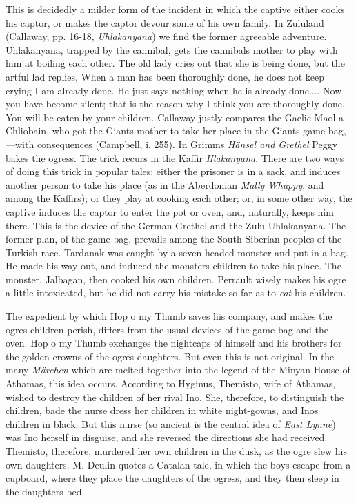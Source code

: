 \documentclass[14pt,a4paper]{memoir}
\begin{document}
{{This is decidedly a milder form of the incident in which the captive
either cooks his captor, or makes the captor devour some of his own
family. In Zululand (Callaway, pp. 16-18, \emph{Uhlakanyana}) we find
the former agreeable adventure. Uhlakanyana, trapped by the cannibal,
gets the cannibal\textquotesingle s mother to play with him at boiling
each other. The old lady cries out that she is \textquotesingle being
done,\textquotesingle{} but the artful lad replies,
\textquotesingle When a man has been thoroughly done, he does not keep
crying I am already done. He just says nothing when he is already
done.... Now you have become silent; that is the reason why I think you
are thoroughly done. You will be eaten by your
children.\textquotesingle{} Callaway justly compares the Gaelic Maol a
Chliobain, who got the Giant\textquotesingle s mother to take her place
in the Giant\textquotesingle s game-bag,---with consequences (Campbell,
i. 255). In Grimm\textquotesingle s \emph{Hänsel and Grethel} Peggy
bakes the ogress. The trick recurs in the Kaffir
\emph{Hlakanyana}.
There are two ways of doing this trick in popular tales: either the
prisoner is in a sack, and induces another person to take his place (as
in the Aberdonian \emph{Mally Whuppy}, and among the Kaffirs); or they
play at cooking each other; or, in some other way, the captive induces
the captor to enter the pot or oven, and, naturally, keeps him there.
This is the device of the German Grethel and the Zulu Uhlakanyana. The
former plan, of the game-bag, prevails among the South Siberian peoples
of the Turkish race. Tardanak was caught by a seven-headed monster and
put in a bag. He made his way out, and induced the
monster\textquotesingle s children to take his place. The monster,
Jalbagan, then cooked his own children. Perrault wisely makes his ogre a
little intoxicated, but he did not carry his mistake so far as to
\emph{eat} his children.

The expedient by which Hop o\textquotesingle{} my Thumb saves his
company, and makes the ogre\textquotesingle s children perish, differs
from the usual devices of the game-bag and the oven. Hop
o\textquotesingle{} my Thumb exchanges the nightcaps of himself and his
brothers for the golden crowns of the ogre\textquotesingle s daughters.
But even this is not original. In the many \emph{Märchen} which are
melted together into the legend of the Minyan House of Athamas, this
idea occurs. According to Hyginus, Themisto, wife of Athamas, wished to
destroy the children of her rival Ino. She, therefore, to distinguish
the children, bade the nurse dress her children in white night-gowns,
and Ino\textquotesingle s children in black. But this nurse (so ancient
is the central idea of \emph{East Lynne}) was Ino herself in disguise,
and she reversed the directions she had received. Themisto, therefore,
murdered her own children in the dusk, as the ogre slew his own
daughters. M. Deulin quotes a Catalan tale, in which the boys escape
from a cupboard, where they place the daughters of the ogress, and they
then sleep in the daughters\textquotesingle{} bed.

}}
\end{document}
